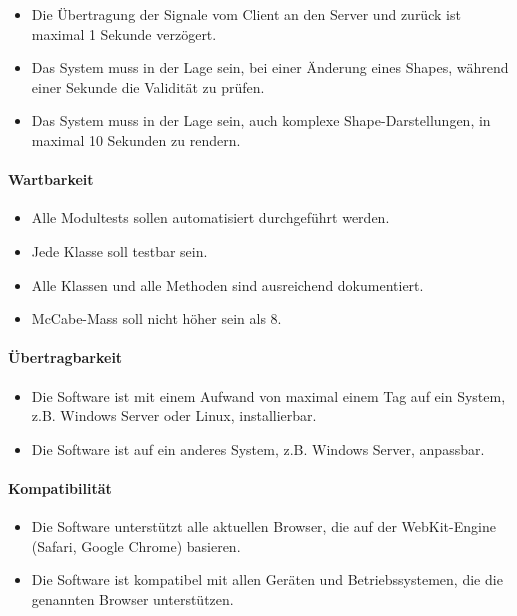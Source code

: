 \begin{itemize}
  \item Die Übertragung der Signale vom Client an den Server und zurück ist maximal 1 Sekunde verzögert.
  \item Das System muss in der Lage sein, bei einer Änderung eines Shapes, während einer Sekunde die Validität zu prüfen.
  \item Das System muss in der Lage sein, auch komplexe Shape-Darstellungen, in maximal 10 Sekunden zu rendern.
\end{itemize}

\paragraph{Wartbarkeit}

\begin{itemize}
  \item Alle Modultests sollen automatisiert durchgeführt werden.
  \item Jede Klasse soll testbar sein.
  \item Alle Klassen und alle Methoden sind ausreichend dokumentiert.
  \item McCabe-Mass soll nicht höher sein als 8.
\end{itemize}

\paragraph{Übertragbarkeit}

\begin{itemize}
  \item Die Software ist mit einem Aufwand von maximal einem Tag auf ein System, z.B. Windows Server oder Linux, installierbar.
  \item Die Software ist auf ein anderes System, z.B. Windows Server, anpassbar.
\end{itemize}

\paragraph{Kompatibilität}

\begin{itemize}
  \item Die Software unterstützt alle aktuellen Browser, die auf der WebKit-Engine (Safari, Google Chrome) basieren.
  \item Die Software ist kompatibel mit allen Geräten und Betriebssystemen, die die genannten Browser unterstützen.
\end{itemize}


